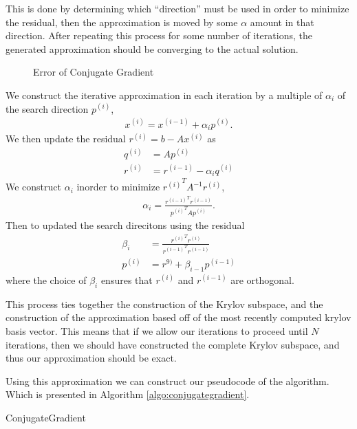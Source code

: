 \documentclass[../fem.tex]{subfile}
\begin{document}
This is done by determining which ``direction'' must be used in order to
minimize the residual, then the approximation is moved by some $\alpha$ amount
in that direction. After repeating this process for some number of iterations,
the generated approximation should be converging to the actual solution.

\begin{figure}[htpb]
  \centering
     
  \caption{Error of Conjugate Gradient}
  \label{fig:cg_err}
\end{figure}

We construct the iterative approximation in each iteration by a multiple of
$\alpha_i$ of the search direction $p^{(i)}$,
\begin{align*}
  x^{(i)}=x^{(i-1)}+\alpha_ip^{(i)}.
\end{align*}
We then update the residual $r^{(i)}=b-Ax^{(i)}$ as
\begin{align*}
  q^{(i)}&=Ap^{(i)}\\
  r^{(i)}&=r^{(i-1)}-\alpha_i q^{(i)}
\end{align*}
We construct $\alpha_i$ inorder to minimize ${r^{(i)}}^TA^{-1}r^{(i)}$,
\begin{align*}
  \alpha_i=\frac{{r^{(i-1)}}^Tr^{(i-1)}}{{p^{(i)}}^TAp^{(i)}}.
\end{align*}
Then to updated the search direcitons using the residual
\begin{align*}
  \beta_i&=\frac{{r^{(i)}}^Tr^{(i)}}{{r^{(i-1)}}^Tr^{(i-1)}}\\
  p^{(i)}&=r^{9)}+\beta_{i-1}p^{(i-1)}
\end{align*}
where the choice of $\beta_i$ ensures that $r^{(i)}$ and $r^{(i-1)}$ are
orthogonal.

This process ties together the construction of the Krylov subspace, and the
construction of the approximation based off of the most recently computed
krylov basis vector. This means that if we allow our iterations to proceed
until $N$ iterations, then we should have constructed the complete Krylov
subspace, and thus our approximation should be exact.

Using this approximation we can construct our pseudocode of the algorithm. Which
is presented in Algorithm \ref{algo:conjugategradient}.

\begin{algorithm}[H]
  \caption{ConjugateGradient}\label{algo:conjugategradient}
  \begin{algorithmic}
    \Else
    \EndIf
    \EndIf
    \EndFor
  \end{algorithmic}
\end{algorithm}
\end{document}
